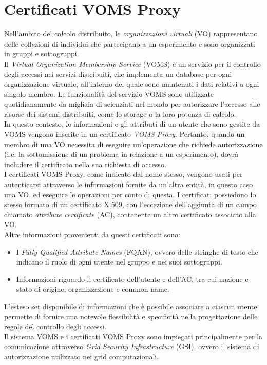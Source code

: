\section{Certificati VOMS Proxy}
Nell'ambito del calcolo distribuito, le \textit{organizzazioni virtuali} (VO) rappresentano delle collezioni 
di individui che partecipano a un esperimento e sono organizzati in gruppi e sottogruppi. 
\\Il \textit{Virtual Organization Membership Service} (VOMS) \cite{voms_res_1} è un servizio per il controllo degli accessi 
nei servizi distribuiti, che implementa
un database per ogni organizzazione virtuale, all'interno del
quale sono mantenuti i dati relativi a ogni singolo membro. Le funzionalità del servizio VOMS sono utilizzate quotidianamente da 
migliaia di scienziati nel mondo per autorizzare l'accesso alle risorse dei sistemi distribuiti, come lo storage o la
loro potenza di calcolo. 
\\ In questo contesto, le informazioni e gli attributi di un utente che sono gestite da VOMS vengono inserite in un certificato \textit{VOMS Proxy}.
Pertanto, quando un membro di una VO necessita di eseguire un'operazione che richiede autorizzazione (i.e. la sottomissione di un problema in relazione a un esperimento), 
dovrà includere il certificato nella sua richiesta di accesso. 
\\ I certificati VOMS Proxy, come indicato dal nome stesso, vengono usati per autenticarsi attraverso le informazioni fornite da un'altra entità, in questo caso una VO, ed eseguire le operazioni
per conto di questa. I certificati possiedono lo stesso formato di un certificato X.509, con l'eccezione dell'aggiunta di un campo chiamato \textit{attribute certificate} (AC),
 contenente un altro certificato associato alla VO. 
\\ Altre informazioni provenienti da questi certificati sono:
\begin{itemize}
    \item I \textit{Fully Qualified Attribute Names} (FQAN), ovvero delle stringhe di testo che indicano il ruolo di ogni utente nel gruppo e nei suoi sottogruppi. 
    \item Informazioni riguardo il certificato dell'utente e dell'AC, tra cui nazione e stato di origine, organizzazione e common name.   
\end{itemize}
L'esteso set disponibile di informazioni che è possibile associare a ciascun utente permette di fornire
 una notevole flessibilità e specificità nella progettazione delle regole del controllo degli accessi. 
 \\ Il sistema VOMS e i certificati VOMS Proxy sono impiegati principalmente per la comunicazione attraverso \textit{Grid Security Infrastructure} (GSI), ovvero 
il sistema di autorizzazione utilizzato nei grid computazionali. 

